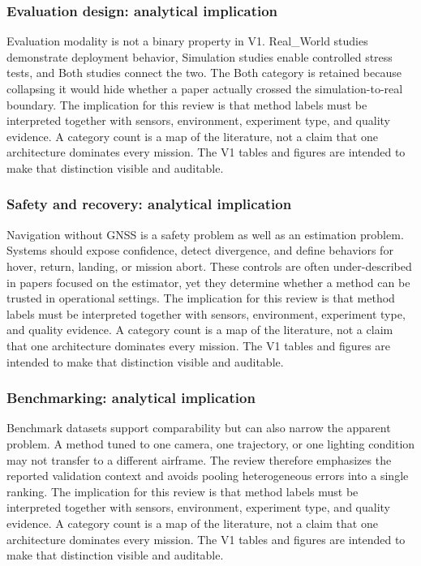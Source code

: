 \documentclass[
  journal,
  10pt]{IEEEtran}
\begin{document}
\subsubsection{Evaluation design: analytical
implication}\label{evaluation-design-analytical-implication}

Evaluation modality is not a binary property in V1. Real\_World studies
demonstrate deployment behavior, Simulation studies enable controlled
stress tests, and Both studies connect the two. The Both category is
retained because collapsing it would hide whether a paper actually
crossed the simulation-to-real boundary. The implication for this review
is that method labels must be interpreted together with sensors,
environment, experiment type, and quality evidence. A category count is
a map of the literature, not a claim that one architecture dominates
every mission. The V1 tables and figures are intended to make that
distinction visible and auditable.

\subsubsection{Safety and recovery: analytical
implication}\label{safety-and-recovery-analytical-implication}

Navigation without GNSS is a safety problem as well as an estimation
problem. Systems should expose confidence, detect divergence, and define
behaviors for hover, return, landing, or mission abort. These controls
are often under-described in papers focused on the estimator, yet they
determine whether a method can be trusted in operational settings. The
implication for this review is that method labels must be interpreted
together with sensors, environment, experiment type, and quality
evidence. A category count is a map of the literature, not a claim that
one architecture dominates every mission. The V1 tables and figures are
intended to make that distinction visible and auditable.

\subsubsection{Benchmarking: analytical
implication}\label{benchmarking-analytical-implication}

Benchmark datasets support comparability but can also narrow the
apparent problem. A method tuned to one camera, one trajectory, or one
lighting condition may not transfer to a different airframe. The review
therefore emphasizes the reported validation context and avoids pooling
heterogeneous errors into a single ranking. The implication for this
review is that method labels must be interpreted together with sensors,
environment, experiment type, and quality evidence. A category count is
a map of the literature, not a claim that one architecture dominates
every mission. The V1 tables and figures are intended to make that
distinction visible and auditable.
\end{document}
